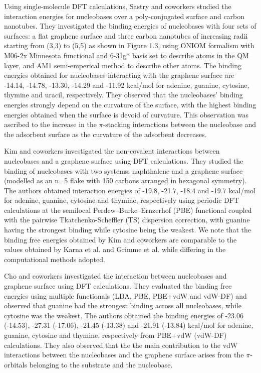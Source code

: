 Using single-molecule DFT calculations, Sastry and coworkers studied the interaction energies for nucleobases over a poly-conjugated surface and carbon nanotubes.\supercite{umadevi_quantum_2011} They investigated the binding energies of nucleobases with four sets of surfaces: a flat graphene surface and three carbon nanotubes of increasing radii starting from (3,3) to (5,5) as shown in Figure 1.3, using ONIOM formalism with M06-2x Minnesota functional and 6-31g* basis set to describe atoms in the QM layer, and AM1 semi-emperical method to describe other atoms. The binding energies obtained for nucleobases interacting with the graphene surface are -14.14, -14.78, -13.30, -14.29 and -11.92 kcal/mol for adenine, guanine, cytosine, thymine and uracil, respectively. They observed that the nucleobases' binding energies strongly depend on the curvature of the surface, with the highest binding energies obtained when the surface is devoid of curvature. This observation was ascribed to the increase in the $\pi$-stacking interactions between the nucleobase and the adsorbent surface as the curvature of the adsorbent decreases.

Kim and coworkers investigated the non-covalent interactions between nucleobases and a graphene surface using DFT calculations.\supercite{cho_noncovalent_2013} They studied the binding of nucleobases with two systems: naphthalene and a graphene surface (modelled as an n=5 flake with 150 carbons arranged in hexagonal symmetry). The authors obtained interaction energies of -19.8, -21.7, -18.4 and -19.7 kcal/mol for adenine, guanine, cytosine and thymine, respectively using periodic DFT calculations at the semilocal Perdew–Burke–Ernzerhof (PBE) functional coupled with the pairwise Tkatchenko-Scheffler (TS) dispersion correction, with guanine having the strongest binding while cytosine being the weakest. We note that the binding free energies obtained by Kim and coworkers are comparable to the values obtained by Karna et al.\supercite{gowtham_physisorption_2007} and Grimme et al.\supercite{antony_structures_2008} while differing in the computational methods adopted.

Cho and coworkers investigated the interaction between nucleobases and graphene surface using DFT calculations\supercite{lee_physisorption_2013}. They evaluated the binding free energies using multiple functionals (LDA, PBE, PBE+vdW and vdW-DF) and observed that guanine had the strongest binding across all nucleobases, while cytosine was the weakest. The authors obtained the binding energies of -23.06 (-14.53), -27.31 (-17.06),  -21.45 (-13.38) and  -21.91 (-13.84) kcal/mol for adenine, guanine, cytosine and thymine, respectively from PBE+vdW (vdW-DF) calculations. They also observed that the the main contribution to the vdW interactions between the nucleobases and the graphene surface arises from the $\pi$-orbitals belonging to the substrate and the nucleobase.

